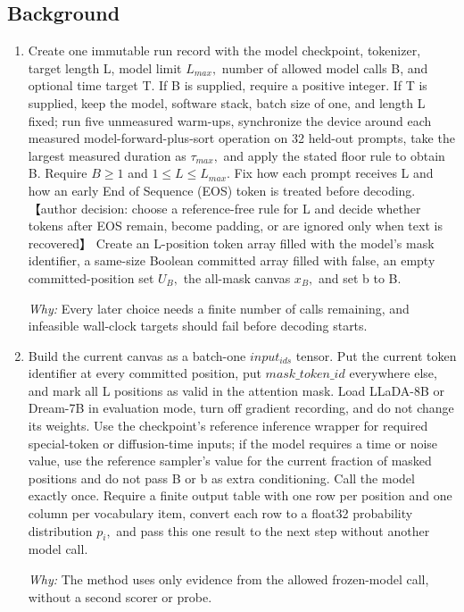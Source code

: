 \documentclass[10pt,a4paper]{article}
\begin{document}
\subsection*{Background}
\begin{enumerate}[leftmargin=*,start=1]
  \item Create one immutable run record with the model checkpoint, tokenizer, target length L, model limit \(L_{max},\) number of allowed model calls B, and optional time target T. If B is supplied, require a positive integer. If T is supplied, keep the model, software stack, batch size of one, and length L fixed;\allowbreak{} run five unmeasured warm-ups, synchronize the device around each measured model-forward-plus-sort operation on 32 held-out prompts, take the largest measured duration as \(\tau _{max},\) and apply the stated floor rule to obtain B. Require \(B \ge  1\) and \(1 \le  L \le  L_{max}.\) Fix how each prompt receives L and how an early End of Sequence (EOS) token is treated before decoding. 【author decision: choose a reference-free rule for L and decide whether tokens after EOS remain, become padding, or are ignored only when text is recovered】 Create an L-position token array filled with the model's mask identifier, a same-size Boolean committed array filled with false, an empty committed-position set \(U_{B},\) the all-mask canvas \(x_{B},\) and set b to B.
\par\emph{Why:} Every later choice needs a finite number of calls remaining, and infeasible wall-clock targets should fail before decoding starts.
  \item Build the current canvas as a batch-one \(input_{ids}\) tensor. Put the current token identifier at every committed position, put \(\mathit{mask\_token\_id}\) everywhere else, and mark all L positions as valid in the attention mask. Load LLaDA-8B or Dream-7B in evaluation mode, turn off gradient recording, and do not change its weights. Use the checkpoint's reference inference wrapper for required special-token or diffusion-time inputs;\allowbreak{} if the model requires a time or noise value, use the reference sampler's value for the current fraction of masked positions and do not pass B or b as extra conditioning. Call the model exactly once. Require a finite output table with one row per position and one column per vocabulary item, convert each row to a float32 probability distribution \(p_{i},\) and pass this one result to the next step without another model call.
\par\emph{Why:} The method uses only evidence from the allowed frozen-model call, without a second scorer or probe.

\end{enumerate}
\end{document}
